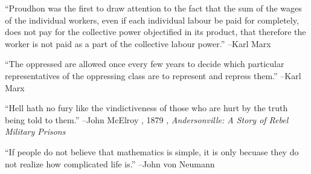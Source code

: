 \documentclass{article}%
\begin{document}
\linebreak%
\vspace{1mm}%
\begin{minipage}{\textwidth}%
\flushleft%
“Proudhon was the first to draw attention to the fact that the sum of the wages of the individual workers, even if each individual labour be paid for completely, does not pay for the collective power objectified in its product, that therefore the worker is not paid as a part of the collective labour power.”%
\linebreak%
\vspace{1mm}%
–Karl Marx%
\linebreak%
\vspace{1mm}%
\end{minipage}%
\linebreak%
\vspace{1mm}%
\begin{minipage}{\textwidth}%
\flushleft%
“The oppressed are allowed once every few years to decide which particular representatives of the oppressing class are to represent and repress them.”%
\linebreak%
\vspace{1mm}%
–Karl Marx%
\linebreak%
\vspace{1mm}%
\end{minipage}%
\linebreak%
\vspace{1mm}%
\begin{minipage}{\textwidth}%
\flushleft%
“Hell hath no fury like the vindictiveness of those who are hurt by the truth being told to them.”%
\linebreak%
\vspace{1mm}%
–John McElroy%
, 1879%
, \textit{Andersonville: A Story of Rebel Military Prisons}%
\linebreak%
\vspace{1mm}%
\end{minipage}%
\linebreak%
\vspace{1mm}%
\begin{minipage}{\textwidth}%
\flushleft%
“If people do not believe that mathematics is simple, it is only becuase they do not realize how complicated life is.”%
\linebreak%
\vspace{1mm}%
–John von Neumann%
\linebreak%
\vspace{1mm}%
\end{minipage}%
\end{document}
